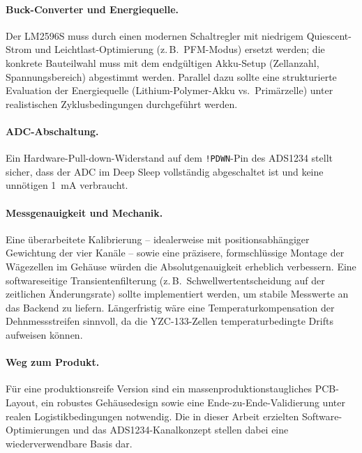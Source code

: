 \documentclass[12pt,a4paper]{article}
\begin{document}
	\paragraph{Buck-Converter und Energiequelle.}
	Der LM2596S muss durch einen modernen Schaltregler mit niedrigem Quiescent-Strom und Leichtlast-Optimierung (z.\,B.\ PFM-Modus) ersetzt werden; die konkrete Bauteilwahl muss mit dem endgültigen Akku-Setup (Zellanzahl, Spannungsbereich) abgestimmt werden.
	Parallel dazu sollte eine strukturierte Evaluation der Energiequelle (Lithium-Polymer-Akku vs.\ Primärzelle) unter realistischen Zyklusbedingungen durchgeführt werden.

	\paragraph{ADC-Abschaltung.}
	Ein Hardware-Pull-down-Widerstand auf dem \texttt{!PDWN}-Pin des ADS1234 stellt sicher, dass der ADC im Deep Sleep vollständig abgeschaltet ist und keine unnötigen \SI{1}{\milli\ampere} verbraucht.

	\paragraph{Messgenauigkeit und Mechanik.}
	Eine überarbeitete Kalibrierung -- idealerweise mit positionsabhängiger Gewichtung der vier Kanäle -- sowie eine präzisere, formschlüssige Montage der Wägezellen im Gehäuse würden die Absolutgenauigkeit erheblich verbessern.
	Eine softwareseitige Transientenfilterung (z.\,B.\ Schwellwertentscheidung auf der zeitlichen Änderungsrate) sollte implementiert werden, um stabile Messwerte an das Backend zu liefern.
	Längerfristig wäre eine Temperaturkompensation der Dehnmessstreifen sinnvoll, da die YZC-133-Zellen temperaturbedingte Drifts aufweisen können.

	\paragraph{Weg zum Produkt.}
	Für eine produktionsreife Version sind ein massenproduktionstaugliches PCB-Layout, ein robustes Gehäusedesign sowie eine Ende-zu-Ende-Validierung unter realen Logistikbedingungen notwendig.
	Die in dieser Arbeit erzielten Software-Optimierungen und das ADS1234-Kanalkonzept stellen dabei eine wiederverwendbare Basis dar.

	
	

	\appendix
\end{document}
